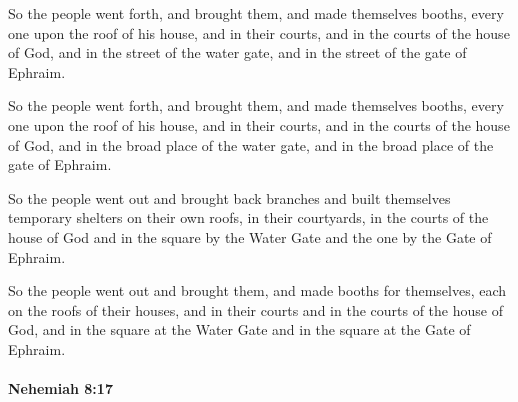 			So the people went forth, and brought them, and made themselves booths, every one upon the roof of his house, and in their courts, and in the courts of the house of God, and in the street of the water gate, and in the street of the gate of Ephraim.

			\begin{versebox}
					\item[BHS] 
					\item[LXX] 
					\item[ASV] So the people went forth, and brought them, and made themselves booths, every one upon the roof of his house, and in their courts, and in the courts of the house of God, and in the broad place of the water gate, and in the broad place of the gate of Ephraim.
					\item[NIV] So the people went out and brought back branches and built themselves temporary shelters on their own roofs, in their courtyards, in the courts of the house of God and in the square by the Water Gate and the one by the Gate of Ephraim.
					\item[NRSV] So the people went out and brought them, and made booths for themselves, each on the roofs of their houses, and in their courts and in the courts of the house of God, and in the square at the Water Gate and in the square at the Gate of Ephraim.
			\end{versebox}

		\paragraph{Nehemiah 8:17} %
			\label{NEHEMIAH-8-17}

